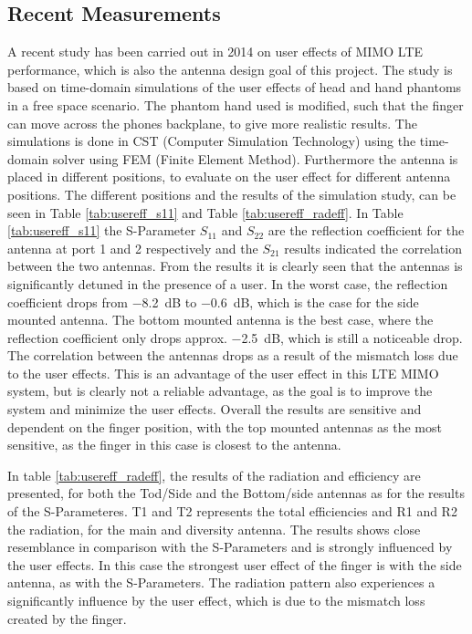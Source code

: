 \subsection{Recent Measurements}
A recent study has been carried out in 2014 on user effects of MIMO LTE performance, which is also the antenna design goal of this project. The study is based on time-domain simulations of the user effects of head and hand phantoms in a free space scenario. The phantom hand used is modified, such that the finger can move across the phones backplane, to give more realistic results. The simulations is done in CST (Computer Simulation Technology) using the time-domain solver using FEM (Finite Element Method). Furthermore the antenna is placed in different positions, to evaluate on the user effect for different antenna positions. The different positions and the results of the simulation study, can be seen in Table \ref{tab:usereff_s11} and Table \ref{tab:usereff_radeff}. In Table \ref{tab:usereff_s11} the S-Parameter $S_{11}$ and $S_{22}$ are the reflection coefficient for the antenna at port 1 and 2 respectively and the $S_{21}$ results indicated the correlation between the two antennas. From the results it is clearly seen that the antennas is significantly detuned in the presence of a user. In the worst case, the reflection coefficient drops from \SI{-8.2}{dB} to \SI{-0.6}{dB}, which is the case for the side mounted antenna. The bottom mounted antenna is the best case, where the reflection coefficient only drops approx. \SI{-2.5}{dB}, which is still a noticeable drop. The correlation between the antennas drops as a result of the mismatch loss due to the user effects. This is an advantage of the user effect in this LTE MIMO system, but is clearly not a reliable advantage, as the goal is to improve the system and minimize the user effects. Overall the results are sensitive and dependent on the finger position, with the top mounted antennas as the most sensitive, as the finger in this case is closest to the antenna.


In table \ref{tab:usereff_radeff}, the results of the radiation and efficiency are presented, for both the Tod/Side and the Bottom/side antennas as for the results of the S-Parameteres. T1 and T2 represents the total efficiencies and R1 and R2 the radiation, for the main and diversity antenna. 
The results shows close resemblance in comparison with the S-Parameters and is strongly influenced by the user effects. In this case the strongest user effect of the finger is with the side antenna, as with the S-Parameters. The radiation pattern also experiences a significantly influence by the user effect, which is due to the mismatch loss created by the finger.  \cite{Samantha2014UserEff}     

